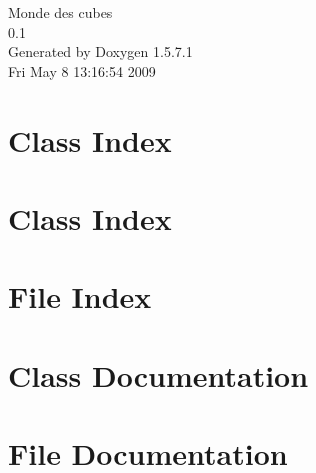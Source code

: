 \documentclass[a4paper]{book}
\begin{document}
\begin{titlepage}
\vspace*{7cm}
\begin{center}
{\Large Monde des cubes \\[1ex]\large 0.1 }\\
\vspace*{1cm}
{\large Generated by Doxygen 1.5.7.1}\\
\vspace*{0.5cm}
{\small Fri May 8 13:16:54 2009}\\
\end{center}
\end{titlepage}
\clearemptydoublepage
{}
\tableofcontents
\clearemptydoublepage
{}
\chapter{Class Index}

\chapter{Class Index}

\chapter{File Index}

\chapter{Class Documentation}


















\chapter{File Documentation}













\printindex
\end{document}
